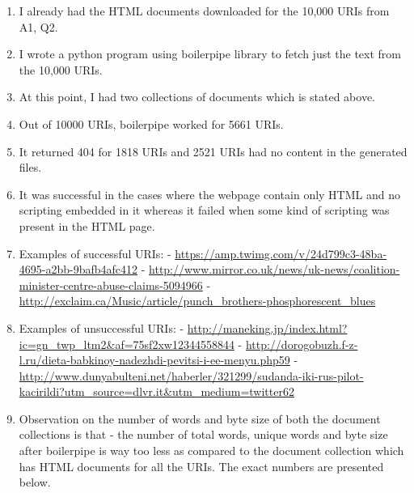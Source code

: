 \begin{enumerate}

\item I already had the HTML documents downloaded for the 10,000 URIs from A1, Q2.
\item I wrote a python program using boilerpipe library to fetch just the text from the 10,000 URIs.
\item At this point, I had two collections of documents which is stated above.
\item Out of 10000 URIs, boilerpipe worked for 5661 URIs.
\item It returned 404 for 1818 URIs and 2521 URIs had no content in the generated files.
\item It was successful in the cases where the webpage contain only HTML and no scripting embedded in it whereas it failed when some kind of scripting was present in the HTML page.

\item Examples of successful URIs: \newline \newline
- \url{https://amp.twimg.com/v/24d799c3-48ba-4695-a2bb-9bafb4afc412} \newline
- \url{http://www.mirror.co.uk/news/uk-news/coalition-minister-centre-abuse-claims-5094966} \newline
- \url{http://exclaim.ca/Music/article/punch_brothers-phosphorescent_blues}	

\item Examples of unsuccessful URIs: \newline \newline
- \url{http://maneking.jp/index.html?ic=gn_twp_ltm2&af=75sf2xw12344558844} \newline
- \url{http://dorogobuzh.f-z-l.ru/dieta-babkinoy-nadezhdi-pevitsi-i-ee-menyu.php59} \newline
- \url{http://www.dunyabulteni.net/haberler/321299/sudanda-iki-rus-pilot-kacirildi?utm_source=dlvr.it&utm_medium=twitter62}
	
\item Observation on the number of words and byte size of both the document collections is that - the number of total words, unique words and byte size after boilerpipe is way too less as compared to the document collection which has HTML documents for all the URIs. The exact numbers are presented below.


\end{enumerate}

